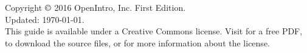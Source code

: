 \chapter*{}
\vfill

\noindent Copyright $\copyright$ 2016 OpenIntro, Inc. First Edition. \\
Updated: \today. \\

\noindent This guide is available under a Creative Commons license. %
Visit  for a free PDF, to download the source files, or for more information about the license. \\


